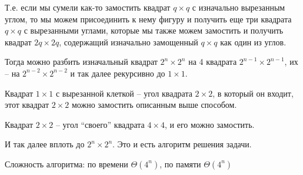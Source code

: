 \documentclass[12pt]{article}
\begin{document}
    \bigskip

    Т.е. если мы сумели как-то замостить квадрат $q\times q$ с изначально вырезанным углом, то мы можем присоединить
    к нему фигуру и получить еще три квадрата $q\times q$ с вырезанными углами, которые мы также можем замостить
    и получить квадрат $2q\times 2q$, содержащий изначально замощенный $q\times q$ как один из углов.

    Тогда можно разбить изначальный квадрат $2^n\times 2^n$ на 4 квадрата $2^{n-1}\times 2^{n-1}$,
    их -- на $2^{n-2}\times 2^{n-2}$ и так далее рекурсивно до $1\times 1$.

    \bigskip

    \begin{center}
    \end{center}

    \bigskip

    Квадрат $1\times 1$ с вырезанной клеткой -- угол квадрата $2\times 2$, в который он входит,
    этот квадрат $2\times 2$ можно замостить описанным выше способом.

    Квадрат $2\times 2$ -- угол ``своего'' квадрата $4\times 4$, и его можно замостить.

    И так далее вплоть до $2^n\times 2^n$.
    Это и есть алгоритм решения задачи.

    Сложность алгоритма: по времени $\Theta(4^n)$, по памяти $\Theta(4^n)$
\end{document}
